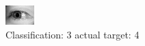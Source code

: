 \begin{figure}[h!]
\begin{center}
\includegraphics[width=0.60\columnwidth]{figures/ID3127_class_3_target_4.png}
\end{center}
\caption{ Classification: 3 actual target: 4}
\label{fig:ID3127_class_3_target_4}
\end{figure}
